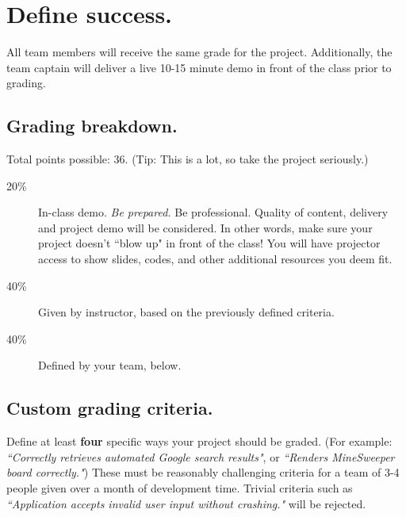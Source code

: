 \documentclass[12pt]{article}
\begin{document}
\pagebreak

\section{Define success.}
All team members will receive the same grade for the project. Additionally, the team captain will deliver a live 10-15 minute demo in front of the class prior to grading.

\subsection{Grading breakdown.}

Total points possible: 36. (Tip: This is a lot, so take the project seriously.)

\begin{description}
\item[20\%] In-class demo. {\it Be prepared.} Be professional. Quality of content, delivery and project demo will be considered. In other words, make sure your project doesn't ``blow up" in front of the class! You will have projector access to show slides, codes, and other additional resources you deem fit. 
\item[40\%] Given by instructor, based on the previously defined criteria.
\item[40\%] Defined by your team, below.
\end{description}

\subsection{Custom grading criteria.}

Define at least {\bf four} specific ways your project should be graded. (For example: {\it ``Correctly retrieves automated Google search results"}, or {\it ``Renders MineSweeper board correctly."}) These must be reasonably challenging criteria for a team of 3-4 people given over a month of development time. Trivial criteria such as {\it ``Application accepts invalid user input without crashing."} will be rejected.

\underline{\phantom{\hspace{5in}}}

\underline{\phantom{\hspace{5in}}}

\underline{\phantom{\hspace{5in}}}

\underline{\phantom{\hspace{5in}}}
\end{document}
